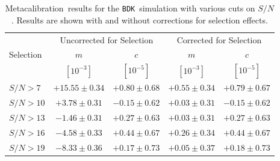 \documentclass[a4paper,fleqn,usenatbib]{mnras}
\newcommand{\snr}{$S/N$}
\newcommand{\Mcal}{Metacalibration}
\newcommand{\bdsim}{\texttt{BDK}}
\begin{document}
\begin{table}
    \centering
    \caption{\Mcal\ results for the \bdsim\ simulation with various
        cuts on \snr.   Results are shown with and without corrections
        for selection effects.
    \label{tab:results_sel}}
    \begin{tabular}{ |l| c|c|  c|c|}
        \hline
        & \multicolumn{2}{c}{Uncorrected for Selection}                      & \multicolumn{2}{c}{Corrected for Selection} \\
        Selection                   & $m$             & $c$            & $m$               & $c$  \\
                                    & $[10^{-3}]$     & $[10^{-5}]$    & $[10^{-3}]$       & $[10^{-5}]$ \\
        \hline
$\mbox{\snr} > 7 $ & $+15.55 \pm 0.34$ & $+0.80 \pm 0.68$ & $+0.55 \pm 0.34$ & $+0.79 \pm 0.67$ \\
$\mbox{\snr} > 10 $ & $+3.78 \pm 0.31$ & $-0.15 \pm 0.62$ & $+0.03 \pm 0.31$ & $-0.15 \pm 0.62$ \\
$\mbox{\snr} > 13 $ & $-1.46 \pm 0.31$ & $+0.27 \pm 0.63$ & $+0.03 \pm 0.31$ & $+0.27 \pm 0.63$ \\
$\mbox{\snr} > 16 $ & $-4.58 \pm 0.33$ & $+0.44 \pm 0.67$ & $+0.26 \pm 0.34$ & $+0.44 \pm 0.67$ \\
$\mbox{\snr} > 19 $ & $-8.33 \pm 0.36$ & $+0.17 \pm 0.73$ & $+0.05 \pm 0.37$ & $+0.18 \pm 0.73$ \\
    \end{tabular}
\end{table}
\end{document}
